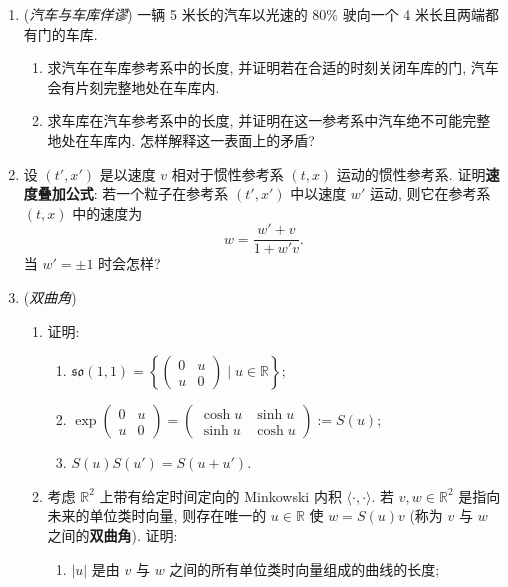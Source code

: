 \begin{RiemannExercise}
\begin{enumerate}[label=(\arabic*),ref=\arabic*,leftmargin=*]
\begin{enumerate}[label=(\alph*),leftmargin=*]
(\textbf{提示}: 注意, 光线由零模直线表示, 即切向量为零模向量的直线; 因此若 Bob 在事件 $q$ 看到 Alice 历程中的事件 $p$, 则必存在一条指向未来的零模直线连接 $p$ 与 $q$.)
\end{enumerate}
\item\label{ex:car-and-garage-paradox}
(\emph{汽车与车库佯谬}) 一辆 5 米长的汽车以光速的 $80\%$ 驶向一个 4 米长且两端都有门的车库.
\begin{enumerate}[label=(\alph*),leftmargin=*]
\item 求汽车在车库参考系中的长度, 并证明若在合适的时刻关闭车库的门, 汽车会有片刻完整地处在车库内.
\item 求车库在汽车参考系中的长度, 并证明在这一参考系中汽车绝不可能完整地处在车库内. 怎样解释这一表面上的矛盾?
\end{enumerate}
\item\label{ex:relativistic-velocity-addition}
设 $(t',x')$ 是以速度 $v$ 相对于惯性参考系 $(t,x)$ 运动的惯性参考系. 证明\textbf{速度叠加公式}: 若一个粒子在参考系 $(t',x')$ 中以速度 $w'$ 运动, 则它在参考系 $(t,x)$ 中的速度为
\[
  w=\frac{w'+v}{1+w'v}.
\]
当 $w'=\pm1$ 时会怎样?
\item\label{ex:hyperbolic-angle}
(\emph{双曲角})
\begin{enumerate}[label=(\alph*),leftmargin=*]
\item 证明:
\begin{enumerate}[label=(\roman*),leftmargin=*]
\item $\mathfrak{so}(1,1)=\left\{\begin{pmatrix}0&u\\u&0\end{pmatrix}\mid u\in\mathbb{R}\right\}$;
\item $\exp\begin{pmatrix}0&u\\u&0\end{pmatrix}=\begin{pmatrix}\cosh u&\sinh u\\\sinh u&\cosh u\end{pmatrix}:=S(u)$;
\item $S(u)S(u')=S(u+u')$.
\end{enumerate}
\item 考虑 $\mathbb{R}^2$ 上带有给定时间定向的 Minkowski 内积 $\langle\cdot,\cdot\rangle$. 若 $v,w\in\mathbb{R}^2$ 是指向未来的单位类时向量, 则存在唯一的 $u\in\mathbb{R}$ 使 $w=S(u)v$ (称为 $v$ 与 $w$ 之间的\textbf{双曲角}). 证明:
\begin{enumerate}[label=(\roman*),leftmargin=*]
\item $|u|$ 是由 $v$ 与 $w$ 之间的所有单位类时向量组成的曲线的长度;

\end{enumerate}
\end{enumerate}
\end{enumerate}
\end{RiemannExercise}
